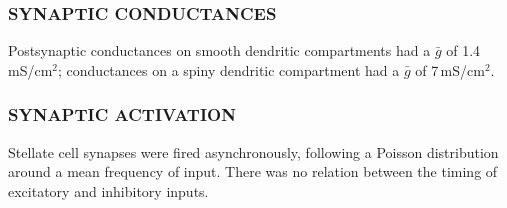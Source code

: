 \documentclass[12pt]{article}
\begin{document}
\subsubsection*{SYNAPTIC CONDUCTANCES}
Postsynaptic conductances on
smooth dendritic compartments had a $\bar g$ of 1.4\,mS/cm$^2$; conductances
on a spiny dendritic compartment had a $\bar g$ of 7\,mS/cm$^2$.

\subsubsection*{SYNAPTIC ACTIVATION}
Stellate cell synapses were fired asynchronously,
following a Poisson distribution around a mean frequency
of input. There was no relation between the timing of
excitatory and inhibitory inputs.



\end{document}
